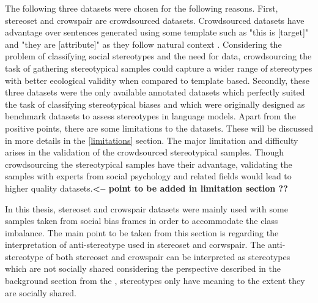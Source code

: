 The following three datasets were chosen for the following reasons. First, stereoset and crowspair are crowdsourced datasets. Crowdsourced datasets have advantage over sentences generated using some template such as "this is [target]" and "they are [attribute]" as they follow natural context \cite{nadeem2020stereoset}. Considering the problem of classifying social stereotypes and the need for data, crowdsourcing the task of gathering stereotypical samples could capture a wider range of stereotypes with better ecological validity when compared to template based. Secondly, these three datasets were the only available annotated datasets which perfectly suited the task of classifying stereotypical biases and which were originally designed as benchmark datasets to assess stereotypes in language models. Apart from the positive points, there are some limitations to the datasets. These will be discussed in more details in the \ref{limitations} section. The major limitation and difficulty arises in the validation of the crowdsourced stereotypical samples. Though crowdsourcing the stereotypical samples have their advantage, validating the samples with experts from social psychology and related fields would lead to higher quality datasets\cite{blodgett2021stereotyping}.\textbf{<-- point to be added in limitation section ??}

In this thesis, stereoset and crowspair datasets were mainly used with some samples taken from social bias frames in order to accommodate the class imbalance. The main point to be taken from this section is regarding the interpretation of anti-stereotype used in stereoset and corwspair. The anti-stereotype of both stereoset and crowspair can be interpreted as stereotypes which are not socially shared considering the perspective described in the background section from the \cite{macrae1996stereotypes}, stereotypes only have meaning to the extent they are socially shared.
